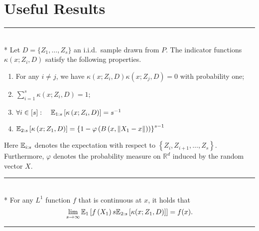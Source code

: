 \section{Useful Results}
\hrule

\begin{lem}\label{lem:dem12}\mbox{}\\*
	Let $D = \{Z_1, \dotsc, Z_s\}$ an i.i.d.\ sample drawn from $P$.
	The indicator functions $\kappa\left(x; Z_{i}, D\right)$ satisfy the following properties.
	\begin{enumerate}
		\item For any $i \neq j$, we have $\kappa\left(x; Z_{i}, D\right) \kappa\left(x; Z_{j}, D\right)=0$ with probability one;
		\item $\sum_{i=1}^{s} \kappa\left(x; Z_{i}, D\right)=1$;
		\item $\forall i \in [s]: \quad \mathbb{E}_{1:s}\left[\kappa\left(x; Z_{i}, D\right)\right]=s^{-1}$
		\item $\mathbb{E}_{2: s}\left[\kappa\left(x; Z_1, D\right)\right]
		= \left\{1-\varphi\left(B\left(x,\left\|X_1-x\right\|\right)\right)\right\}^{s-1}$
	\end{enumerate}
	Here $\mathbb{E}_{i: s}$ denotes the expectation with respect to $\left\{Z_{i}, Z_{i+1}, \dotsc, Z_s\right\}$.
	Furthermore, $\varphi$ denotes the probability measure on $\mathbb{R}^{d}$ induced by the random vector $X$.
\end{lem}

\hrule

\begin{lem}\label{lem:dem13}\mbox{}\\*
	For any $L^1$ function $f$ that is continuous at $x$, it holds that
	\begin{equation}
		\lim _{s \rightarrow \infty} \mathbb{E}_{1}\left[f\left(X_1\right) s \mathbb{E}_{2:s}\left[\kappa(x; Z_1, D)\right]\right]
		= f(x).
	\end{equation}
\end{lem}

\hrule

